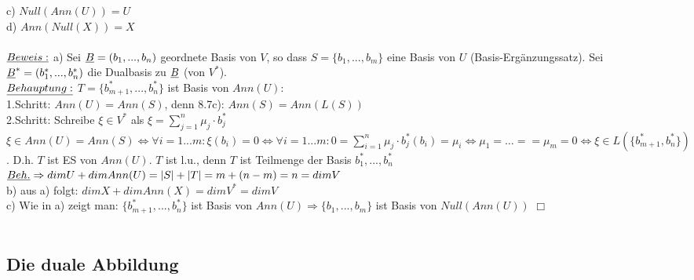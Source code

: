 \documentclass[fleqn, a4paper, 11pt]{scrartcl}
\theoremstyle{definition}
\begin{document}
c) $Null(Ann(U))=U$\\
d) $Ann(Null(X))=X$\\
\\
$\uline{Beweis:}$ a) Sei $\uline{B}=(b_1,...,b_n)$ geordnete Basis von $V$, so dass $S=\{b_1,...,b_m\}$ eine Basis von $U$ (Basis-Ergänzungssatz). Sei $\uline{B}^{\ast}=(b_1^{\ast},...,b_n^{\ast})$ die Dualbasis zu $\uline{B}$ (von $V^{\ast}$).\\
$\uline{Behauptung:}$ $T=\{b_{m+1}^{\ast},...,b_n^{\ast}\}$ ist Basis von $Ann(U)$:\\
1.Schritt: $Ann(U)=Ann(S)$, denn 8.7c): $Ann(S)=Ann(L(S))$\\
2.Schritt: Schreibe $\xi\in V^{\ast}$ als $\xi=\sum\limits_{j=1}^n \mu_j\cdot b_j^{\ast}$\\
$\xi\in Ann(U)=Ann(S)\Leftrightarrow \forall i=1...m:\xi(b_i)=0\Leftrightarrow \forall i=1...m:0=\sum\limits_{i=1}^n \mu_j\cdot b_j^{\ast}(b_i)=\mu_i\Leftrightarrow \mu_1=\dots==\mu_m=0\Leftrightarrow \xi\in L(\{b_{m+1}^{\ast},b_n^{\ast}\})$. D.h. $T$ ist ES von $Ann(U)$. $T$ ist l.u., denn $T$ ist Teilmenge der Basis $b_1^{\ast},...,b_n^{\ast}$\\
$\uline{Beh.}\Rightarrow dim U+dim Ann(U)=|S|+|T|=m+(n-m)=n=dim V$\\
b) aus a) folgt: $dim X+dim Ann(X)=dim V^{\ast}=dim V$\\
c) Wie in a) zeigt man: $\{b_{m+1}^{\ast},...,b_n^{\ast}\}$ ist Basis von $Ann(U)\Rightarrow\{b_1,...,b_m\}$ ist Basis von $Null(Ann(U))$ \hfill $\Box$\\
\\
\subsection{Die duale Abbildung}
\end{document}
